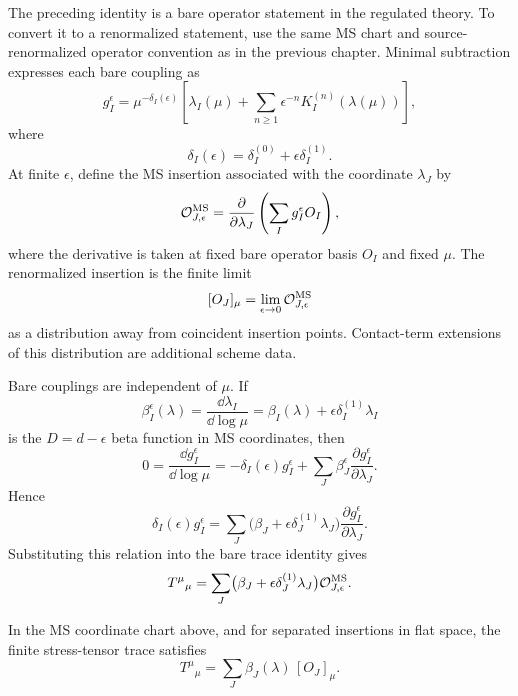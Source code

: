 The preceding identity is a bare operator statement in the regulated theory.
To convert it to a renormalized statement, use the same MS chart and
source-renormalized operator convention as in the previous chapter.  Minimal
subtraction expresses each bare coupling as
\[
  g_I^\epsilon
  =
  \mu^{-\delta_I(\epsilon)}
  \left[
    \lambda_I(\mu)
    +
    \sum_{n\ge1}
    \epsilon^{-n}K_I^{(n)}(\lambda(\mu))
  \right],
\]
where
\[
  \delta_I(\epsilon)
  =
  \delta_I^{(0)}+\epsilon\delta_I^{(1)}.
\]
At finite \(\epsilon\), define the MS insertion associated with the coordinate
\(\lambda_J\) by
\[
  \mathcal O_{J,\epsilon}^{\rm MS}
  =
  \frac{\partial}{\partial\lambda_J}
  \left(\sum_I g_I^\epsilon O_I\right),
\]
where the derivative is taken at fixed bare operator basis \(O_I\) and fixed
\(\mu\).  The renormalized insertion is the finite limit
\[
  [O_J]_\mu
  =
  \lim_{\epsilon\to0}\mathcal O_{J,\epsilon}^{\rm MS}
\]
as a distribution away from coincident insertion points.  Contact-term
extensions of this distribution are additional scheme data.

Bare couplings are independent of \(\mu\).  If
\[
  \beta_I^\epsilon(\lambda)
  =
  \frac{\dd\lambda_I}{\dd\log\mu}
  =
  \beta_I(\lambda)+\epsilon\delta_I^{(1)}\lambda_I
\]
is the \(D=d-\epsilon\) beta function in MS coordinates, then
\[
  0
  =
  \frac{\dd g_I^\epsilon}{\dd\log\mu}
  =
  -\delta_I(\epsilon)g_I^\epsilon
  +
  \sum_J
  \beta_J^\epsilon
  \frac{\partial g_I^\epsilon}{\partial\lambda_J}.
\]
Hence
\[
  \delta_I(\epsilon)g_I^\epsilon
  =
  \sum_J
  \bigl(\beta_J+\epsilon\delta_J^{(1)}\lambda_J\bigr)
  \frac{\partial g_I^\epsilon}{\partial\lambda_J}.
\]
Substituting this relation into the bare trace identity gives
\[
  T^\mu{}_\mu
  =
  \sum_J
  \bigl(\beta_J+\epsilon\delta_J^{(1)}\lambda_J\bigr)
  \mathcal O_{J,\epsilon}^{\rm MS}.
\]

\begin{lemma}
In the MS coordinate chart above, and for separated insertions in flat space,
the finite stress-tensor trace satisfies
\begin{equation}
  T^\mu{}_\mu
  =
  \sum_J\beta_J(\lambda)\,[O_J]_\mu .
  \label{eq:renormalized-trace-identity}
\end{equation}
\end{lemma}

